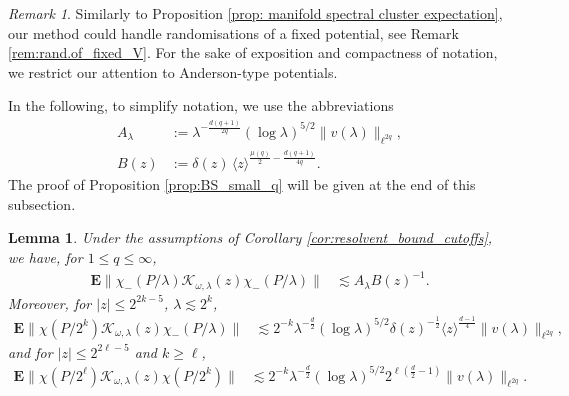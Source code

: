 \documentclass[12pt,reqno]{amsart}
\newtheorem{lemma}[theorem]{Lemma}
\theoremstyle{definition}
\theoremstyle{remark}
\newtheorem{remark}[theorem]{Remark}
\numberwithin{equation}{section}
\newcommand{\1}{\mathbbm{1}}
\begin{document}
\begin{remark}
    Similarly to Proposition \ref{prop: manifold spectral cluster expectation}, our method could handle randomisations of a fixed potential, see Remark \ref{rem:rand.of_fixed_V}. For the sake of exposition and compactness of notation, we restrict our attention to Anderson-type potentials.
\end{remark}

In the following, to simplify notation, we use the abbreviations
\begin{align}
A_{\lambda} & := \lambda^{-\frac{d(q+1)}{2q}}
(\log\lambda)^{5/2}\|v(\lambda)\|_{\ell^{2q}},
\label{def:Alambda}
\\
B(z) & := \delta(z)
\,\langle z\rangle^{\frac{\mu(q)}{2}-\frac{d(q+1)}{4q}}.\label{def:B(z)}
\end{align}
%
The proof of Proposition \ref{prop:BS_small_q} will be given at the end of this subsection.

\begin{lemma}\label{lem:asymmetric_Birman-Schwinger}
 Under the assumptions of Corollary \ref{cor:resolvent_bound_cutoffs}, we have, for $1\leq q\leq \infty$,
 \begin{align}\label{eq:chi_-chi_-}
 \mathbf{E}\|\chi_-(P/\lambda)\mathcal{K}_{\omega,\lambda}(z)\chi_-(P/\lambda)\|&\lesssim A_{\lambda}B(z)^{-1}.
 \end{align}
Moreover, for $|z|\leq 2^{2k-5}$, $\lambda\lesssim 2^k$,
\begin{align}
\mathbf{E}\|\chi(P/2^k)\mathcal{K}_{\omega,\lambda}(z)\chi_-(P/\lambda)\|&\lesssim 2^{-k}\lambda^{-\frac{d}{2}}(\log\lambda)^{5/2}\delta(z)^{-\frac{1}{2}} \langle z\rangle^{\frac{d-1}{4}}\|v(\lambda)\|_{\ell^{2q}},
 \label{eq:chi_k_chi_-}
 \end{align}
 and for $|z|\leq 2^{2\ell-5}$ and $k\geq \ell$,
 \begin{align}
\mathbf{E}\|\chi(P/2^\ell)\mathcal{K}_{\omega,\lambda}(z)\chi(P/2^k)\|&\lesssim 2^{-k}\lambda^{-\frac{d}{2}}(\log\lambda)^{5/2}2^{\ell(\frac{d}{2}-1)}\|v(\lambda)\|_{\ell^{2q}}.
 \label{eq:chi_l_chi_k}
 \end{align}
\end{lemma}
\end{document}

